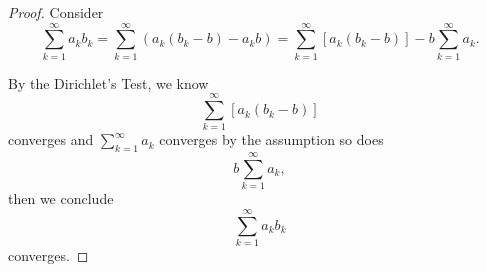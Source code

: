 \begin{Exercise}
\begin{proof}
Consider 
$$
\sum_{k=1}^{\infty}a_k b_k 
= \sum_{k=1}^{\infty}\left( a_k(b_k-b) - a_k b\right) 
= \sum_{k=1}^{\infty}\left[ a_k(b_k-b) \right] - b\sum_{k=1}^{\infty}a_k.
$$

By the Dirichlet's Test, we know 
$$
\sum_{k=1}^{\infty}\left[ a_k(b_k-b) \right]
$$ 
converges and $\sum_{k=1}^{\infty}a_k$ converges by the assumption so does 
$$
b\sum_{k=1}^{\infty}a_k,
$$
then we conclude 
$$
\sum_{k=1}^{\infty}a_k b_k
$$ 
converges.
\end{proof}
\end{Exercise}